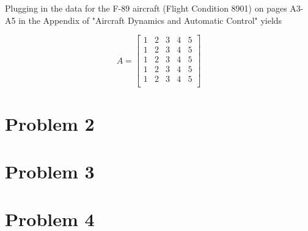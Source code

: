 \documentclass[12pt]{article}
\begin{document}
\noindent Plugging in the data for the F-89 aircraft (Flight Condition 8901) on pages A3-A5 in the Appendix of "Aircraft Dynamics and Automatic Control" yields

\begin{equation*}
A =
\begin{bmatrix}
    1 & 2 & 3 & 4 & 5 \\
    1 & 2 & 3 & 4 & 5 \\
    1 & 2 & 3 & 4 & 5 \\
    1 & 2 & 3 & 4 & 5 \\
    1 & 2 & 3 & 4 & 5 \\
\end{bmatrix}
\end{equation*}

\section{Problem 2}


\section{Problem 3}
\section{Problem 4}
\end{document}
